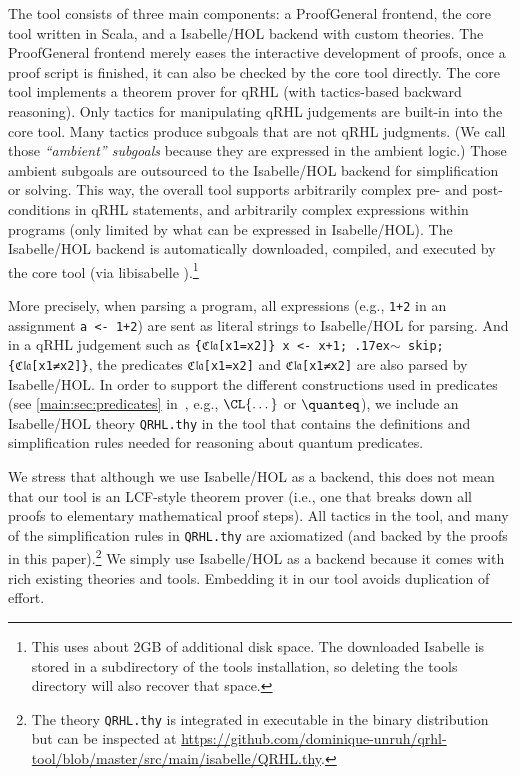 \documentclass{article}
\newcommand\mytilde{\raise.17ex\hbox{$\scriptstyle\sim$}}
\newcommand\qrhlautoref[1]{\autoref*{main:#1} in~\cite{qrhl-paper-from-manual}}
\begin{document}
The tool consists of three main components: a ProofGeneral
\cite{proofgeneral} frontend, the core tool written in Scala, and a
Isabelle/HOL \cite{isabelle} backend with custom theories. The
ProofGeneral frontend merely eases the interactive development of
proofs, once a proof script is finished, it can also be checked by the
core tool directly. The core tool implements a theorem prover for qRHL
(with tactics-based backward reasoning). Only tactics for manipulating
qRHL judgements are built-in into the core tool. Many tactics produce
subgoals that are not qRHL judgments.
(We call those \emph{``ambient'' subgoals}%
 because they are expressed in the ambient logic.)
Those ambient subgoals are outsourced to
the Isabelle/HOL backend for simplification or solving. This way, the
overall tool supports arbitrarily complex pre- and post-conditions in
qRHL statements, and arbitrarily complex expressions within programs
(only limited by what can be expressed in Isabelle/HOL). The
Isabelle/HOL backend is automatically downloaded, compiled, and
executed by the core tool (via libisabelle \cite{libisabelle}).\footnote{This
  uses about 2GB of additional disk space.
  The downloaded Isabelle is stored in a subdirectory of the tools installation,
  so deleting the tools directory will also recover that space.}
  

More precisely, when parsing a program, all expressions (e.g.,
\texttt{1+2} in an assignment \texttt{a <- 1+2}) are sent as literal
strings to Isabelle/HOL for parsing. And in a qRHL judgement such as
\texttt{\{ℭ𝔩𝔞[x1=x2]\} x <- x+1; \mytilde{} skip; \{ℭ𝔩𝔞[x1≠x2]\}}, the
predicates \texttt{ℭ𝔩𝔞[x1=x2]} and \texttt{ℭ𝔩𝔞[x1≠x2]} are also parsed
by Isabelle/HOL. In order to support the different constructions used
in predicates (see \qrhlautoref{sec:predicates}, e.g., $\CL{\dots}$
or $\quanteq$),
we include an Isabelle/HOL theory \texttt{QRHL.thy} in the tool that
contains the definitions and simplification rules needed for reasoning
about quantum predicates.

We stress that although we use Isabelle/HOL as a backend, this does
not mean that our tool is an LCF-style theorem prover (i.e., one that
breaks down all proofs to elementary mathematical proof steps).  All
tactics in the tool, and many of the simplification rules in
\texttt{QRHL.thy} are axiomatized (and backed by the proofs in this
paper).\footnote{The theory \texttt{QRHL.thy} is integrated in executable in the binary distribution
  but can be inspected 
  at \url{https://github.com/dominique-unruh/qrhl-tool/blob/master/src/main/isabelle/QRHL.thy}.}
We simply use Isabelle/HOL as a backend because it comes with
rich existing theories and tools. Embedding it in our tool avoids
duplication of effort.
\end{document}
